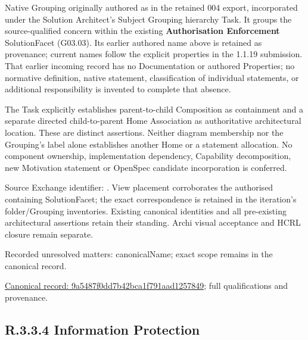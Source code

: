 Native Grouping originally authored as \texttt{} in the retained 004 export,
incorporated under the Solution Architect's Subject Grouping hierarchy Task.
It groups the source-qualified \texttt{} concern within
the existing \textbf{Authorisation Enforcement} SolutionFacet (G03.03). Its earlier authored name above is retained as provenance; current names
follow the explicit properties in the 1.1.19 submission.
That earlier incoming record has no Documentation or authored Properties; no normative
definition, native statement, classification of individual statements, or
additional responsibility is invented to complete that absence.



The Task explicitly establishes parent-to-child Composition as containment and
a separate directed child-to-parent Home Association as authoritative architectural
location. These are distinct assertions. Neither diagram membership nor the
Grouping's label alone establishes another Home or a statement allocation.
No component ownership, implementation dependency, Capability decomposition,
new Motivation statement or OpenSpec candidate incorporation is conferred.



Source Exchange identifier: \texttt{}. View placement corroborates
the authorised containing SolutionFacet; the exact correspondence is retained in the
iteration's folder/Grouping inventories. Existing canonical identities and all
pre-existing architectural assertions retain their standing. Archi visual
acceptance and HCRL closure remain separate.


{\small Recorded unresolved matters: canonicalName; exact scope remains in the canonical record.}\par
{\footnotesize \href{../../../../../../../continuum/grouping/9a5487f0dd7b42bca1f791aad1257849.md}{Canonical record: 9a5487f0dd7b42bca1f791aad1257849}; full qualifications and provenance.}\par
\subsection*{R.3.3.4 Information Protection}
\label{navigation:R.3.3.4}

